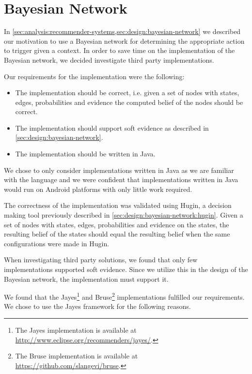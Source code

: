 \section{Bayesian Network}
\label{sec:implementation:bayesian-network}

In \cref{sec:analysis:recommender-systems,sec:design:bayesian-network} we described our motivation to use a Bayesian network for determining the appropriate action to trigger given a context. In order to save time on the implementation of the Bayesian network, we decided investigate third party implementations.

Our requirements for the implementation were the following:

\begin{itemize}
\item The implementation should be correct, i.e. given a set of nodes with states, edges, probabilities and evidence the computed belief of the nodes should be correct.
\item The implementation should support soft evidence as described in \cref{sec:design:bayesian-network}.
\item The implementation should be written in Java.
\end{itemize}

We chose to only consider implementations written in Java as we are familiar with the language and we were confident that implementations written in Java would run on Android platforms with only little work required. 

The correctness of the implementation was validated using Hugin, a decision making tool previously described in \cref{sec:design:bayesian-network:hugin}. Given a set of nodes with states, edges, probabilities and evidence on the states, the resulting belief of the states should equal the resulting belief when the same configurations were made in Hugin.

When investigating third party solutions, we found that only few implementations supported soft evidence. Since we utilize this in the design of the Bayesian network, the implementation must support it. 

We found that the Jayes\footnote{The Jayes implementation is available at \url{http://www.eclipse.org/recommenders/jayes/}.} and Bruse\footnote{The Bruse implementation is available at \url{https://github.com/slangevi/bruse}.} implementations fulfilled our requirements. We chose to use the Jayes framework for the following reasons.

